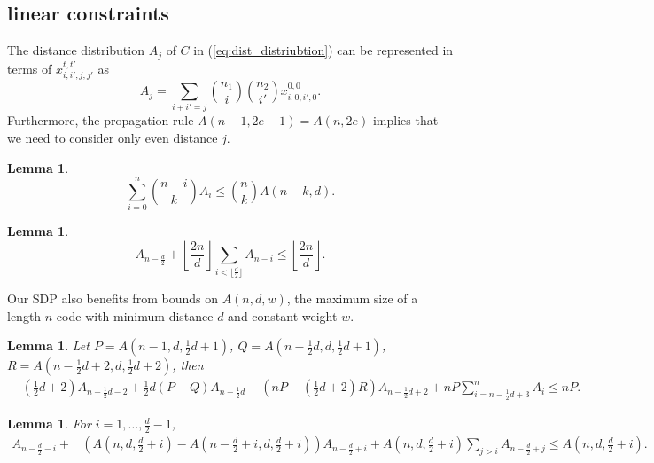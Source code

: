 \documentclass[final,onecolumn]{IEEEtran}
\newtheorem{lemmaenv}[definitionenv]{Lemma}
\newenvironment{lemma}{\begin{lemmaenv}\rm}{\end{lemmaenv}}
\theoremstyle{definition}
\begin{document}
\subsection{linear constraints}
The distance distribution $A_j$ of  $C$ in (\ref{eq:dist_distriubtion}) can be represented in terms of $x_{i,i',j,j'}^{t,t'}$ as
\begin{equation*}
	A_{j} = \sum_{i+i' = j} \binom{n_{1}}{i} \binom{n_{2}}{i'} x_{i, 0, i', 0}^{0, 0}. 
\end{equation*}
Furthermore, the propagation rule  $A(n-1, 2e-1) = A(n, 2e)$ \cite{MS77} implies that we  need to consider only even distance $j$.

\begin{lemma}\cite[Lemma $7$]{Bes80}
	\begin{equation}
		\sum_{i = 0}^{n} \binom{n-i}{k}A_{i} \leq \binom{n}{k} A(n-k, d). \label{le3}
	\end{equation} 
\end{lemma}
	
\begin{lemma}\cite[Theorem $9$]{MEL02}
	\begin{equation}
		\label{le4}
		A_{n-\frac{d}{2}}+\left\lfloor \frac{2n}{d} \right\rfloor \sum_{i < \lfloor \frac{d}{2} \rfloor}A_{n-i} \leq \left\lfloor \frac{2n}{d} \right\rfloor.
	\end{equation}
\end{lemma}
	
Our SDP also benefits from bounds on $A(n,d,w)$, the maximum size of a length-$n$ code with minimum distance $d$ and constant weight $w$.
\begin{lemma}\cite[Lemma $5$]{Bes80}
	Let $P = A(n-1, d, \frac{1}{2}d+1)$, $Q = A(n-\frac{1}{2}d, d, \frac{1}{2}d+1)$, $R = A(n-\frac{1}{2}d+2, d, \frac{1}{2}d+2)$, then
	\begin{equation}
		\label{le5}
		\begin{aligned}
			&(\frac{1}{2}d+2)A_{n-\frac{1}{2}d-2}+\frac{1}{2}d(P-Q)A_{n-\frac{1}{2}d} +(n P-(\frac{1}{2}d+2)R)A_{n-\frac{1}{2}d+2}+n P\sum_{i = n-\frac{1}{2}d+3}^{n} A_{i} \leq n P.
		\end{aligned}
	\end{equation}
\end{lemma}
	
\begin{lemma}\cite[Theorem $10$]{MEL02}
	For $i = 1, \dots, \frac{d}{2}-1$, 
	\begin{equation}
		\label{le6}
		\begin{aligned}
			A_{n-\frac{d}{2}-i}+&(A(n, d, \frac{d}{2}+i)-A(n-\frac{d}{2}+i, d, \frac{d}{2}+i))A_{n-\frac{d}{2}+i}+A(n, d, \frac{d}{2}+i)\sum_{j>i}A_{n-\frac{d}{2}+j} \leq A(n, d, \frac{d}{2}+i).
		\end{aligned}
	\end{equation}
\end{lemma}
	
\end{document}
